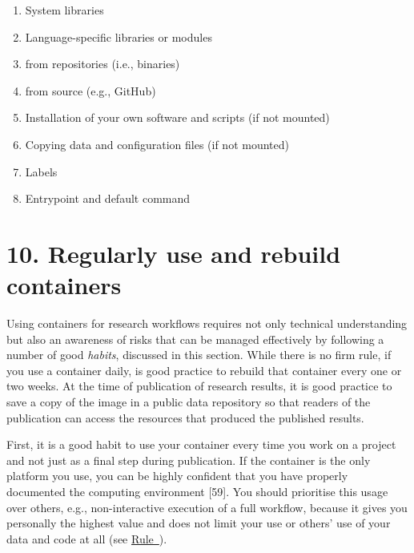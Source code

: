 \documentclass[10pt,letterpaper]{article}
\providecommand{\tightlist}{%
  \setlength{\itemsep}{0pt}\setlength{\parskip}{0pt}}
\begin{document}
\begin{enumerate}
\def\labelenumi{\arabic{enumi}.}
\tightlist
\item
  System libraries
\item
  Language-specific libraries or modules
\item
  from repositories (i.e., binaries)
\item
  from source (e.g., GitHub)
\item
  Installation of your own software and scripts (if not mounted)
\item
  Copying data and configuration files (if not mounted)
\item
  Labels
\item
  Entrypoint and default command
\end{enumerate}

\hypertarget{regularly-use-and-rebuild-containers}{%
\section*{10. Regularly use and rebuild
containers}\label{regularly-use-and-rebuild-containers}}

  \label{rule:usage} 

Using containers for research workflows requires not only technical
understanding but also an awareness of risks that can be managed
effectively by following a number of good \emph{habits}, discussed in
this section. While there is no firm rule, if you use a container daily,
is good practice to rebuild that container every one or two weeks. At
the time of publication of research results, it is good practice to save
a copy of the image in a public data repository so that readers of the
publication can access the resources that produced the published
results.

First, it is a good habit to use your container every time you work on a
project and not just as a final step during publication. If the
container is the only platform you use, you can be highly confident that
you have properly documented the computing environment {[}59{]}. You
should prioritise this usage over others, e.g., non-interactive
execution of a full workflow, because it gives you personally the
highest value and does not limit your use or others' use of your data
and code at all (see
\hyperref[{rule:interactive}]{Rule~}).
\end{document}
